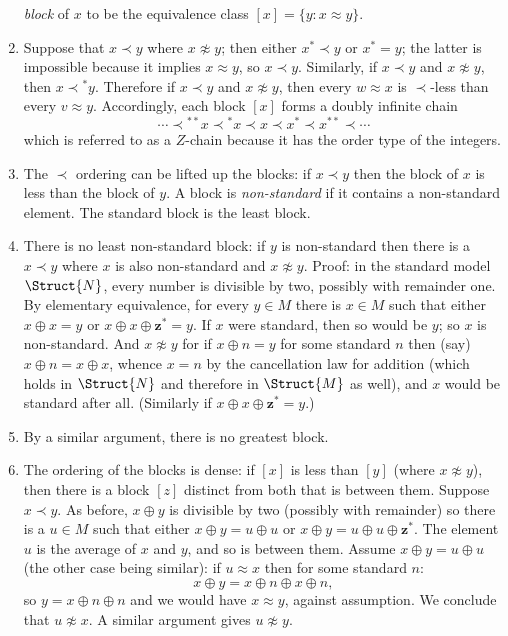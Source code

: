 \documentclass[../../include/open-logic-section]{subfiles}
\begin{document}
\begin{enumerate}
  \emph{block} of $x$ to be the equivalence class $[x] = \{y: x
  \approx y \}$. 
\item Suppose that $x \prec y$ where $x \not\approx y$; then either
  $x^* \prec y$ or $x^* = y$; the latter is impossible because it
  implies $x \approx y$, so $x \prec y$. Similarly, if $x \prec y$ and
  $x \not\approx y$, then $x \prec {^*y}$. Therefore if $x \prec y$
  and $x \not\approx y$, then every $w \approx x$ is $\prec$-less than
  every $v \approx y$. Accordingly, each block $[x]$ forms a doubly
  infinite chain
  \[
  \cdots \prec  {^{**}x} \prec {^*}x \prec x \prec x^* \prec x^{**}
  \prec \cdots
  \]
  which is referred to as a $Z$-chain because it has the order type of
  the integers.
\item The $\prec$ ordering can be lifted up the blocks: if $x \prec y$
  then the block of $x$ is less than the block of $y$. A block is
  \emph{non-standard} if it contains a non-standard element. The
  standard block is the least block. 
\item There is no least non-standard block: if $y$ is non-standard
  then there is a $x \prec y$ where $x$ is also non-standard and $x
  \not\approx y$. Proof: in the standard model $\Struct{N}$, every
  number is divisible by two, possibly with remainder one. By
  elementary equivalence, for every $y \in M$ there is $x \in M$ such
  that either $x \oplus x = y$ or  $x \oplus x \oplus
  \mathbf{z}^*= y$. If $x$ were standard, then so would be $y$; so $x$
  is non-standard. And $x \not\approx y$ for if $x \oplus n = y$
  for some standard $n$ then (say) $x \oplus n = x \oplus x$, whence
  $x = n$ by the cancellation law for addition (which holds in
  $\Struct{N}$ and therefore in $\Struct{M}$ as well), and $x$
  would be standard after all. (Similarly if  $x \oplus x \oplus
  \mathbf{z}^*= y$.)
\item By a similar argument, there is no greatest block. 
\item The ordering of the blocks is dense: if $[x]$ is less than $[y]$
  (where $x \not\approx y$), then there is a block $[z]$ distinct from
  both that is between them. Suppose $x \prec y$. As before, $x
  \oplus y$ is divisible by two (possibly with remainder) so there
  is a $u \in M$ such that either $x \oplus y = u \oplus u$ or
  $x \oplus y = u \oplus u \oplus \mathbf{z}^*$. The element
  $u$ is the average of $x$ and $y$, and so is between them. Assume $x
  \oplus y = u \oplus u$ (the other case being similar): if $u
  \approx x$ then for some standard $n$:
  \[
  x \oplus y = x \oplus n \oplus x \oplus n,
  \]
  so $y = x \oplus n \oplus n$ and we would have $x \approx y$,
  against assumption. We conclude that $u \not\approx x$. A similar
  argument gives $u \not\approx y$.
\end{enumerate}
\end{document}
